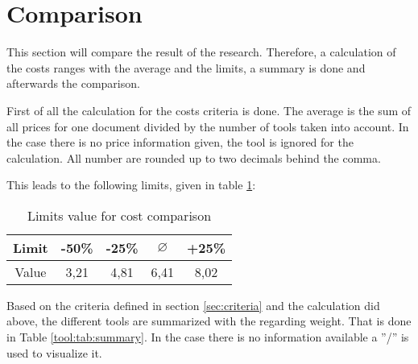 \section{Comparison} \label{tool:sec:compT}
This section will compare the result of the research. Therefore, a calculation of the costs ranges with the average and the limits, a summary is done and afterwards the comparison.

First of all the calculation for the costs criteria is done. The average is the sum of all prices for one document divided by the number of tools taken into account. In the case there is no price information given, the tool is ignored for the calculation. All number are rounded up to two decimals behind the comma.
\begin{center}
\end{center}

This leads to the following limits, given in table \ref{tool:tab:limitscosts}:
\begin{table}[h!]
	\begin{tabular}{|c|c|c|c|c|} \hline
		Limit & -50\% & -25\% & $ \varnothing$ & +25\% \\ \hline
		Value & 3,21 & 4,81 & 6,41 & 8,02 \\ \hline
	\end{tabular}
	\centering
	\caption{Limits value for cost comparison}
	\label{tool:tab:limitscosts}
\end{table}

Based on the criteria defined in section \ref{sec:criteria} and the calculation did above, the different tools are summarized with the regarding weight. That is done in Table \ref{tool:tab:summary}. In the case there is no information available a ''/'' is used to visualize it.

